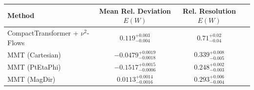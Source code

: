     \begin{tabular}{lccc}
        \toprule
        Method & Mean Rel. Deviation $E(W)$ & Rel. Resolution $E(W)$ \\
        \midrule
        CompactTransformer + $\nu^2$-Flows & $0.119^{+0.003}_{-0.004}$ & $0.71^{+0.02}_{-0.04}$ \\
        MMT (Cartesian) & $-0.0479^{+0.0019}_{-0.0018}$ & $0.339^{+0.008}_{-0.005}$ \\
        MMT (PtEtaPhi) & $-0.1517^{+0.0015}_{-0.0006}$ & $0.248^{+0.002}_{-0.003}$ \\
        MMT (MagDir) & $0.0113^{+0.0014}_{-0.0016}$ & $0.293^{+0.006}_{-0.004}$ \\
        \bottomrule
    \end{tabular}